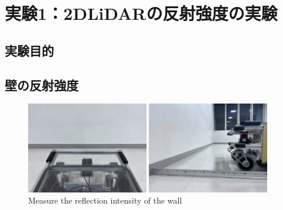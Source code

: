 
\section{実験1：2DLiDARの反射強度の実験}

\subsection{実験目的}

\newpage

\subsection{壁の反射強度}
  \begin{figure}[h]
    \centering
    \begin{minipage}[c]{65mm} 
        \centering
        \includegraphics[height=40mm]{images/RobotGuidance_exp1_wall_from_back.png}
    \end{minipage}
    \begin{minipage}[c]{65mm} 
        \centering
        \includegraphics[height=40mm]{images/RobotGuidance_exp1_wall_from_side.png}
    \end{minipage}
    \caption{Measure the reflection intensity of the wall}
    \label{Fig:RobotGuidance_exp1_wall}
  \end{figure}

\newpage

